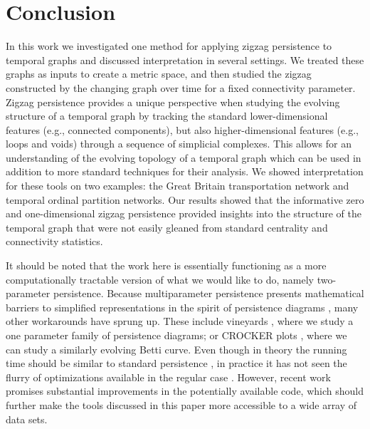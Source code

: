 %
%
%
\section{Conclusion}
\label{sec:conclusion}
%
In this work we investigated one method for applying zigzag persistence to temporal graphs and discussed interpretation in several settings. 
We treated these graphs as inputs to create a metric space, and then studied the zigzag constructed by the changing graph over time for a fixed connectivity parameter. 
Zigzag persistence provides a unique perspective when studying the evolving structure of a temporal graph by tracking the standard lower-dimensional features (e.g., connected components), but also higher-dimensional features (e.g., loops and voids) through a sequence of simplicial complexes.
This allows for an understanding of the evolving topology of a temporal graph which can be used in addition to more standard techniques for their analysis.
We showed interpretation for these tools on two examples: the Great Britain transportation network and temporal ordinal partition networks. 
Our results showed that the informative zero and one-dimensional zigzag persistence provided insights into the structure of the temporal graph that were not easily gleaned from standard centrality and connectivity statistics. 

It should be noted that the work here is essentially functioning as a more computationally tractable version of what we would like to do, namely two-parameter persistence. 
Because multiparameter persistence presents mathematical barriers to simplified representations in the spirit of persistence diagrams \cite{Carlsson2009a}, many other workarounds have sprung up. 
These include vineyards \cite{CohenSteiner2006}, where we study a one parameter family of persistence diagrams; or CROCKER plots \cite{Ulmer2019,Guezel2022}, where we can study a similarly evolving Betti curve. 
Even though in theory the running time  should be similar to standard persistence \cite{Milosavljevic2011}, in practice it has not seen the flurry of optimizations available in the regular case \cite{Bauer2021,Otter2017}. 
However, recent work \cite{Dey2021a,Dey2022,Dey2021b} promises substantial improvements in the potentially available code, which should further make the tools discussed in this paper more accessible to a wide array of data sets. 


